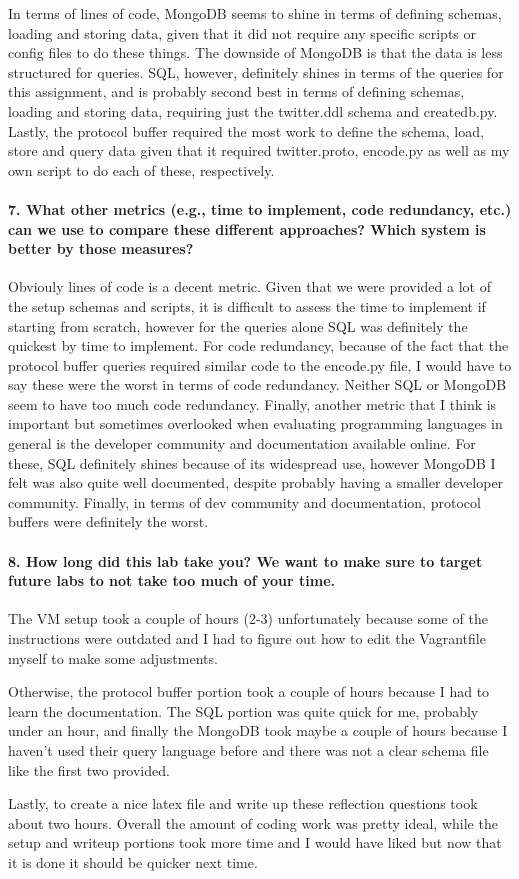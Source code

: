\documentclass[12pt]{article}
\begin{document}
In terms of lines of code, MongoDB seems to shine in terms of defining schemas, loading and storing data, given that it did not require any specific scripts or config files to do these things. The downside of MongoDB is that the data is less structured for queries. SQL, however, definitely shines in terms of the queries for this assignment, and is probably second best in terms of defining schemas, loading and storing data, requiring just the twitter.ddl schema and createdb.py. Lastly, the protocol buffer required the most work to define the schema, load, store and query data given that it required twitter.proto, encode.py as well as my own script to do each of these, respectively.   

\paragraph{7. What other metrics (e.g., time to implement, code redundancy, etc.) can we use to compare these different approaches? Which system is better by those measures?}

Obviouly lines of code is a decent metric. Given that we were provided a lot of the setup schemas and scripts, it is difficult to assess the time to implement if starting from scratch, however for the queries alone SQL was definitely the quickest by time to implement. For code redundancy, because of the fact that the protocol buffer queries required similar code to the encode.py file, I would have to say these were the worst in terms of code redundancy. Neither SQL or MongoDB seem to have too much code redundancy.  Finally, another metric that I think is important but sometimes overlooked when evaluating programming languages in general is the developer community and documentation available online. For these, SQL definitely shines because of its widespread use, however MongoDB I felt was also quite well documented, despite probably having a smaller developer community. Finally, in terms of dev community and documentation, protocol buffers were definitely the worst.

\paragraph{8. How long did this lab take you? We want to make sure to target future labs to not take too much of your time.}

The VM setup took a couple of hours (2-3) unfortunately because some of the instructions were outdated and I had to figure out how to edit the Vagrantfile myself to make some adjustments. 

Otherwise, the protocol buffer portion took a couple of hours because I had to learn the documentation.  The SQL portion was quite quick for me, probably under an hour, and finally the MongoDB took maybe a couple of hours because I haven't used their query language before and there was not a clear schema file like the first two provided. 

Lastly, to create a nice latex file and write up these reflection questions took about two hours. Overall the amount of coding work was pretty ideal, while the setup and writeup portions took more time and I would have liked but now that it is done it should be quicker next time.
\end{document}

